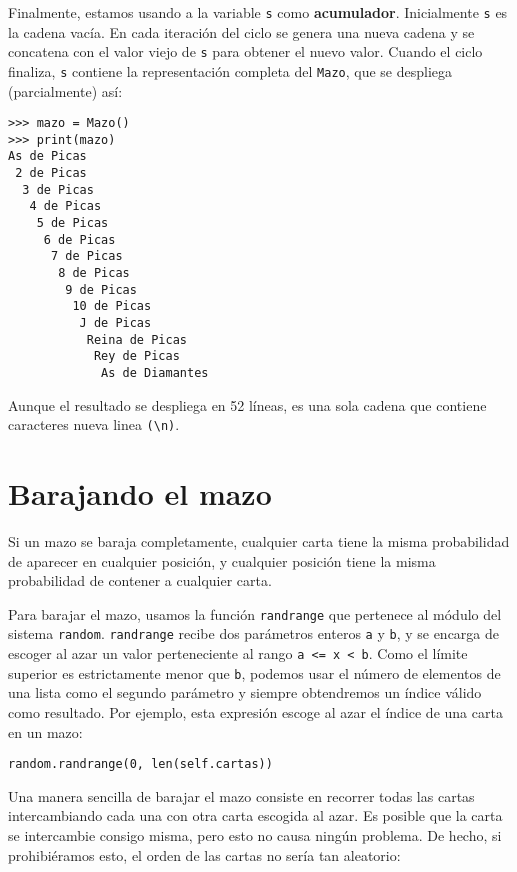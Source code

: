 
Finalmente, estamos usando a la variable \texttt{s} como \textbf{acumulador}.
Inicialmente \texttt{s} es la cadena vacía. En cada iteración del
ciclo se genera una nueva cadena y se concatena con el valor viejo
de \texttt{s} para obtener el nuevo valor. Cuando el ciclo finaliza,
\texttt{s} contiene la representación completa del \texttt{Mazo},
que se despliega (parcialmente) así:

\begin{verbatim}
>>> mazo = Mazo()
>>> print(mazo)
As de Picas
 2 de Picas
  3 de Picas
   4 de Picas
    5 de Picas
     6 de Picas
      7 de Picas
       8 de Picas
        9 de Picas
         10 de Picas
          J de Picas
           Reina de Picas
            Rey de Picas
             As de Diamantes
\end{verbatim}
 Aunque el resultado se despliega en 52 líneas, es una sola cadena
que contiene caracteres nueva linea \verb+(\n)+.

\section{Barajando el mazo}


Si un mazo se baraja completamente, cualquier carta tiene la misma
probabilidad de aparecer en cualquier posición, y cualquier posición
tiene la misma probabilidad de contener a cualquier carta.

 

Para barajar el mazo, usamos la función \texttt{randrange} que pertenece
al módulo del sistema \texttt{random}. \texttt{randrange} recibe dos
parámetros enteros \texttt{a} y \texttt{b}, y se encarga de escoger
al azar un valor perteneciente al rango \texttt{a <= x < b}. Como
el límite superior es estrictamente menor que \texttt{b}, podemos
usar el número de elementos de una lista como el segundo parámetro
y siempre obtendremos un índice válido como resultado. Por ejemplo,
esta expresión escoge al azar el índice de una carta en un mazo:

\begin{verbatim}
random.randrange(0, len(self.cartas))
\end{verbatim}
 Una manera sencilla de barajar el mazo consiste en recorrer todas
las cartas intercambiando cada una con otra carta escogida al azar.
Es posible que la carta se intercambie consigo misma, pero esto no
causa ningún problema. De hecho, si prohibiéramos esto, el orden de
las cartas no sería tan aleatorio:

